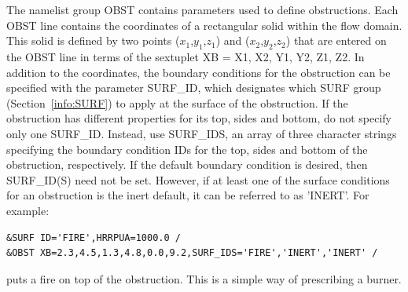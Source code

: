 \documentclass[11pt]{book}
\begin{document}
The namelist group {\ct OBST} contains parameters used to define obstructions.
Each {\ct OBST} line contains the coordinates of a rectangular
solid within the flow domain. This solid is defined by two points
($x_1$,$y_1$,$z_1$) and ($x_2$,$y_2$,$z_2$) that are entered on the
{\ct OBST} line in terms of the sextuplet {\ct XB = X1, X2, Y1, Y2, Z1, Z2}.
In addition to the coordinates, the boundary conditions for the obstruction
can be specified with the parameter {\ct SURF\_ID}, which designates which
{\ct SURF} group (Section~\ref{info:SURF}) to apply at the surface of the obstruction.
If the obstruction has different properties for its top,
sides and bottom, do not specify only one {\ct SURF\_ID}. Instead, use {\ct SURF\_IDS}, an array of three character
strings specifying the boundary condition {\ct ID}s for the top,
sides and bottom of the obstruction, respectively.
If the default
boundary condition is desired, then {\ct SURF\_ID(S)} need not be set.
However, if at least one of the surface conditions for an
obstruction is the inert default, it can be referred to as {\ct 'INERT'}.
For example:

\footnotesize
\begin{verbatim}
&SURF ID='FIRE',HRRPUA=1000.0 /
&OBST XB=2.3,4.5,1.3,4.8,0.0,9.2,SURF_IDS='FIRE','INERT','INERT' /
\end{verbatim}
\normalsize
puts a fire on top of the obstruction. This is a simple way of
prescribing a burner.
\end{document}
